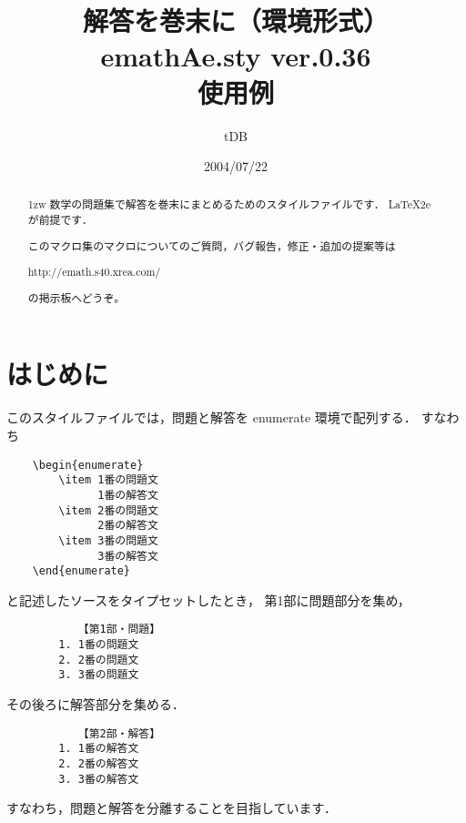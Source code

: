 \documentclass{jarticle}
\begin{document}
\title{解答を巻末に（環境形式）\\
emathAe.sty {\normalsize ver.0.36}\\使用例}
\author{tDB}
\date{2004/07/22}

\maketitle\thispagestyle{empty}
\begin{abstract}%
\parindent1zw%
数学の問題集で解答を巻末にまとめるためのスタイルファイルです．
\LaTeX2e が前提です．

このマクロ集のマクロについてのご質問，バグ報告，修正・追加の提案等は
\begin{center}
http://emath.s40.xrea.com/
\end{center}
の掲示板へどうぞ。
\end{abstract}

\tableofcontents

\pagebreak

\section{はじめに}
このスタイルファイルでは，問題と解答を \textsf{enumerate} 環境で配列する．
すなわち
\begin{screen}
\begin{jquote}
\begin{verbatim}
    \begin{enumerate}
        \item 1番の問題文
              1番の解答文
        \item 2番の問題文
              2番の解答文
        \item 3番の問題文
              3番の解答文
    \end{enumerate}
\end{verbatim}
\end{jquote}
\end{screen}
と記述したソースをタイプセットしたとき，
第1部に問題部分を集め，
\begin{shadebox}
\begin{jquote}
\begin{verbatim}
           【第1部・問題】
        1. 1番の問題文
        2. 2番の問題文
        3. 3番の問題文
\end{verbatim}
\end{jquote}
\end{shadebox}
その後ろに解答部分を集める．
\begin{shadebox}
\begin{jquote}
\begin{verbatim}
           【第2部・解答】
        1. 1番の解答文
        2. 2番の解答文
        3. 3番の解答文
\end{verbatim}
\end{jquote}
\end{shadebox}
すなわち，問題と解答を分離することを目指しています．
\end{document}
